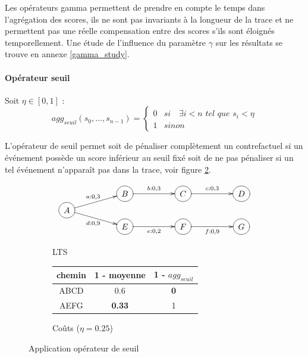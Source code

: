     
    Les opérateurs gamma permettent de prendre en compte le temps dans l'agrégation des scores, ils ne sont pas invariants à la longueur de la trace et ne permettent pas une réelle compensation entre des scores s'ils sont éloignés temporellement. Une étude de l'influence du paramètre $\gamma$ sur les résultats se trouve en annexe \ref{gamma_study}.

\paragraph{Opérateur seuil} Soit $\eta\in[0,1]$ :
\begin{equation}
    agg_{seuil}(s_0,\dots,s_{n-1}) = \begin{cases}
        0 & si \quad \exists i<n \textit{ tel que } s_i < \eta
        \\ 1 & sinon
    \end{cases}
\end{equation}



L'opérateur de seuil permet soit de pénaliser complètement un contrefactuel si un événement possède un score inférieur au seuil fixé soit de ne pas pénaliser si un tel événement n'apparaît pas dans la trace, voir figure \ref{fig:seuil}. 

    \begin{figure}[h!]
        \centering
        \begin{subfigure}[b]{0.45\textwidth}
            \centering
            \[
            \xymatrix @R=0.1em@C=5em {
             & *++[o][F-]{B} \ar[r]^{b:0,3} & *++[o][F-]{C} \ar[r]^{c:0,3} & *++[o][F-]{D}  \\
              *++[o][F-]{A} \ar[ru]^{a:0,3} \ar[rd]_{d:0,9} \\
            & *++[o][F-]{E} \ar[r]_{e:0,2} & *++[o][F-]{F} \ar[r]_{f:0,9}  & *++[o][F-]{G}
            }
            \]
            \caption{LTS}
            \label{fig:lts_gamma}
        \end{subfigure}
        \hfill
        \begin{subfigure}[b]{0.45\textwidth}
            \centering
            \begin{tabular}{ccc}
                chemin & 1 - moyenne & 1 - $agg_{seuil}$   \\
                \hline
                ABCD & 0.6 & \textbf{0}  \\
                AEFG & \textbf{0.33} & 1 \\
            \end{tabular}
            \caption{Coûts ($\eta =0.25$)}
        \end{subfigure}
        \caption{Application opérateur de seuil}
        \label{fig:seuil}
    \end{figure}

